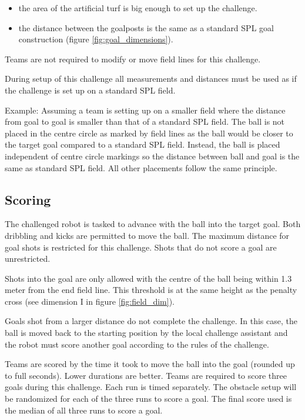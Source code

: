 \begin{itemize}
	\item the area of the artificial turf is big enough to set up the challenge.
	\item the distance between the goalposts is the same as a standard SPL goal construction (\cf figure \ref{fig:goal_dimensions}).
\end{itemize}

Teams are not required to modify or move field lines for this challenge.

During setup of this challenge all measurements and distances must be used as if the challenge is set up on a standard SPL field.

Example: Assuming a team is setting up on a smaller field where the distance from goal to goal is smaller than that of a standard SPL field. The ball is not placed in the centre circle as marked by field lines as the ball would be closer to the target goal compared to a standard SPL field. Instead, the ball is placed independent of centre circle markings so the distance between ball and goal is the same as standard SPL field. All other placements follow the same principle.

\subsection{Scoring}

The challenged robot is tasked to advance with the ball into the target goal. Both dribbling and kicks are permitted to move the ball. The maximum distance for goal shots is restricted for this challenge. Shots that do not score a goal are unrestricted.

Shots into the goal are only allowed with the centre of the ball being within 1.3 meter from the end field line. This threshold is at the same height as the penalty cross (see dimension I in figure \ref{fig:field_dim}).

Goals shot from a larger distance do not complete the challenge. In this case, the ball is moved back to the starting position by the local challenge assistant and the robot must score another goal according to the rules of the challenge.

Teams are scored by the time it took to move the ball into the goal (rounded up to full seconds). Lower durations are better. Teams are required to score three goals during this challenge. Each run is timed separately. The obstacle setup will be randomized for each of the three runs to score a goal. The final score used is the median of all three runs to score a goal.

